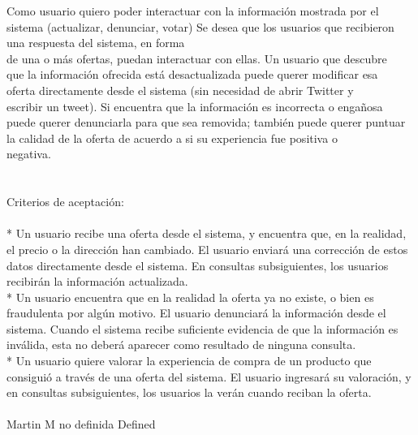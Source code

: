 	{Como usuario quiero poder interactuar con la información mostrada por el sistema (actualizar, denunciar, votar)} %
	{Se desea que los usuarios que recibieron una respuesta del sistema, en forma\\
de una o más ofertas, puedan interactuar con ellas. Un usuario que descubre\\
que la información ofrecida está desactualizada puede querer modificar esa\\
oferta directamente desde el sistema (sin necesidad de abrir Twitter y\\
escribir un tweet). Si encuentra que la información es incorrecta o engañosa\\
puede querer denunciarla para que sea removida; también puede querer puntuar\\
la calidad de la oferta de acuerdo a si su experiencia fue positiva o\\
negativa.\\
\\
  \\
Criterios de aceptación:\\
\\
* Un usuario recibe una oferta desde el sistema, y encuentra que, en la realidad, el precio o la dirección han cambiado. El usuario enviará una corrección de estos datos directamente desde el sistema. En consultas subsiguientes, los usuarios recibirán la información actualizada.  \\
* Un usuario encuentra que en la realidad la oferta ya no existe, o bien es fraudulenta por algún motivo. El usuario denunciará la información desde el sistema. Cuando el sistema recibe suficiente evidencia de que la información es inválida, esta no deberá aparecer como resultado de ninguna consulta.  \\
* Un usuario quiere valorar la experiencia de compra de un producto que consiguió a través de una oferta del sistema. El usuario ingresará su valoración, y en consultas subsiguientes, los usuarios la verán cuando reciban la oferta.\\
\\
} %
	{} %
	{} %
	{Martin M} %
	{no definida} %
	{Defined} %


\vspace{20pt}

